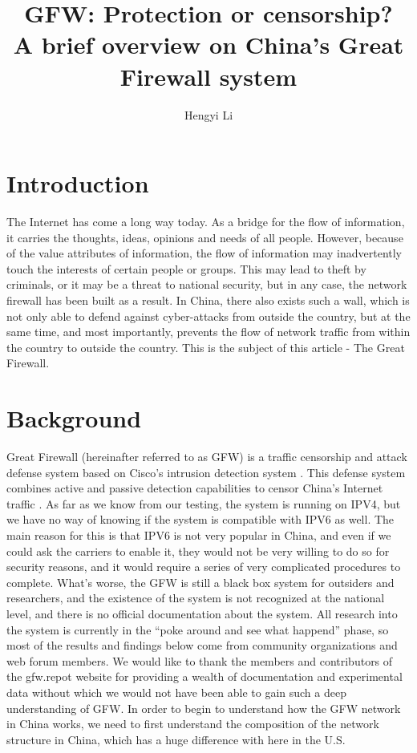 \documentclass[11pt]{article}
\title{GFW: Protection or censorship?\\ \large A brief overview on China's Great Firewall system}
\author{Hengyi Li}
\begin{document}
\maketitle

\section{Introduction}

The Internet has come a long way today. As a bridge for the flow of information,
it carries the thoughts, ideas, opinions and needs of all people. However,
because of the value attributes of information, the flow of information may
inadvertently touch the interests of certain people or groups. This may lead to
theft by criminals, or it may be a threat to national security, but in any case,
the network firewall has been built as a result. In China, there also exists
such a wall, which is not only able to defend against cyber-attacks from outside
the country, but at the same time, and most importantly, prevents the flow of
network traffic from within the country to outside the country. This is the
subject of this article - The Great Firewall.

\section{Background}
Great Firewall (hereinafter referred to as GFW) is a traffic censorship and
attack defense system based on Cisco's intrusion detection system \cite{CISCO}.
This defense system combines active and passive detection capabilities to censor
China's Internet traffic \cite{DetectBlockShadowSocks}.
As far as we know from our testing, the system is running on IPV4, but we have no way of knowing if the system is compatible with
IPV6 as well. The main reason for this is that IPV6 is not very popular in China,
and even if we could ask the carriers to enable it, they would not be very
willing to do so for security reasons, and it would require a series of very
complicated procedures to complete. What's worse, the GFW is still a black box
system for outsiders and researchers, and the existence of the system is not
recognized at the national level, and there is no official documentation about
the system. All research into the system is currently in the ``poke around and
see what happend'' phase, so most of the results and findings below come from
community organizations and web forum members. We would like to thank the
members and contributors of the gfw.repot \cite{GFWReport} website for providing a wealth of
documentation and experimental data without which we would not have been able to
gain such a deep understanding of GFW. In order to begin to understand how the
GFW network in China works, we need to first understand the composition of the
network structure in China, which has a huge difference with here in the U.S.
\end{document}
